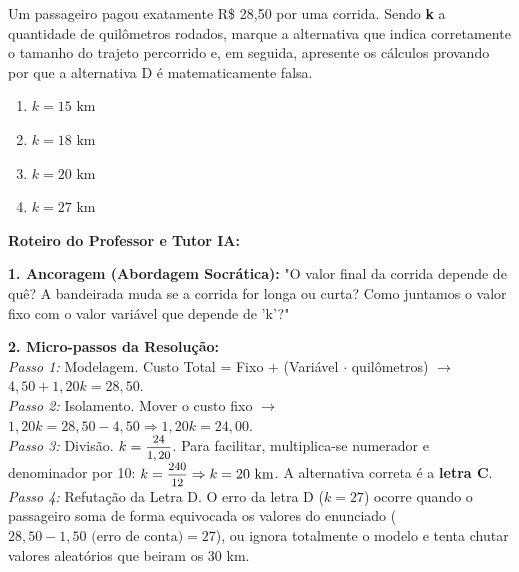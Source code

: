 \begin{multicols*}{2}
\begin{enunciadoLiteral}
Um passageiro pagou exatamente R\$ 28,50 por uma corrida. Sendo \textbf{k} a quantidade de quilômetros rodados, marque a alternativa que indica corretamente o tamanho do trajeto percorrido e, em seguida, apresente os cálculos provando por que a alternativa D é matematicamente falsa.

\begin{enumerate}[label=\alph*), itemsep=\espacoAlt]
\item $ k = 15 \text{ km} $
\item $ k = 18 \text{ km} $
\item $ k = 20 \text{ km} $
\item $ k = 27 \text{ km} $
\end{enumerate}
\end{enunciadoLiteral}

\ifgabarito
    \begin{tcolorbox}[colback=CorTitUm!5, colframe=CorTitUm, boxrule=1pt, arc=4pt, left=6pt, right=6pt, top=6pt, bottom=6pt]
    \small\textbf{\textcolor{CorTitUm}{Roteiro do Professor e Tutor IA:}}\par\vspace{0.1cm}
    \color{CinzaEscuro}
    \textbf{1. Ancoragem (Abordagem Socrática):} "O valor final da corrida depende de quê? A bandeirada muda se a corrida for longa ou curta? Como juntamos o valor fixo com o valor variável que depende de 'k'?"\par\vspace{0.1cm}
    
    \textbf{2. Micro-passos da Resolução:}\\
    \textit{Passo 1:} Modelagem. Custo Total = Fixo + (Variável $\cdot$ quilômetros) $\rightarrow$ $4,50 + 1,20k = 28,50$.\\
    \textit{Passo 2:} Isolamento. Mover o custo fixo $\rightarrow$ $1,20k = 28,50 - 4,50 \Rightarrow 1,20k = 24,00$.\\
    \textit{Passo 3:} Divisão. $k = \mfrac{24}{1,20}$. Para facilitar, multiplica-se numerador e denominador por 10: $k = \mfrac{240}{12} \Rightarrow k = 20 \text{ km}$. A alternativa correta é a \textbf{letra C}.\\
    \textit{Passo 4:} Refutação da Letra D. O erro da letra D ($k = 27$) ocorre quando o passageiro soma de forma equivocada os valores do enunciado ($28,50 - 1,50 \text{ (erro de conta)} = 27$), ou ignora totalmente o modelo e tenta chutar valores aleatórios que beiram os 30 km.\par\vspace{0.1cm}
    

\end{tcolorbox}
\end{multicols*}
